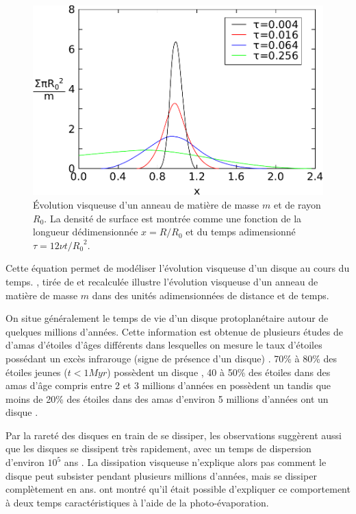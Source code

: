 \begin{figure}[htbp]
\centering
\includegraphics[width=0.65\linewidth]{figure/pringle_viscous_dissipation.pdf}
\caption{Évolution visqueuse d'un anneau de matière de masse $m$ et de rayon $R_0$. La densité de surface est montrée comme une fonction de la longueur dédimensionnée $x=R/R_0$ et du temps adimensionné $\tau=12\nu t / {R_0}^2$.}\label{fig:pringle_viscous_dissipation}
\end{figure}

Cette équation permet de modéliser l'évolution visqueuse d'un disque au cours du temps. , tirée de \cite{pringle1981accretion} et recalculée illustre l'évolution visqueuse d'un anneau de matière de masse $m$ dans des unités adimensionnées de distance et de temps.

\bigskip

On situe généralement le temps de vie d'un disque protoplanétaire autour de quelques millions d'années. Cette information est obtenue de plusieurs études de d'amas d'étoiles d'âges différents dans lesquelles on mesure le taux d'étoiles possédant un excès infrarouge (signe de présence d'un disque) \citep{williams2011protoplanetary}. 70\% à 80\% des étoiles jeunes ($t<1\unit{Myr}$) possèdent un disque \citep{winston2007combined, gutermuth2008spitzer}, 40 à 50\% des étoiles dans des amas d'âge compris entre 2 et 3 millions d'années en possèdent un \citep{lada2006spitzer, sung2009spitzer} tandis que moins de 20\% des étoiles dans des amas d'environ 5 millions d'années ont un disque \citep{currie2009last}. 

Par la rareté des disques en train de se dissiper, les observations suggèrent aussi que les disques se dissipent très rapidement, avec un temps de dispersion d'environ $10^5$ ans \citep{simon1995disk, wolk1996search}. La dissipation visqueuse n'explique alors pas comment le disque peut subsister pendant plusieurs millions d'années, mais se dissiper complètement en  ans. \cite{clarke2001dispersal} ont montré qu'il était possible d'expliquer ce comportement à deux temps caractéristiques à l'aide de la photo-évaporation. 

